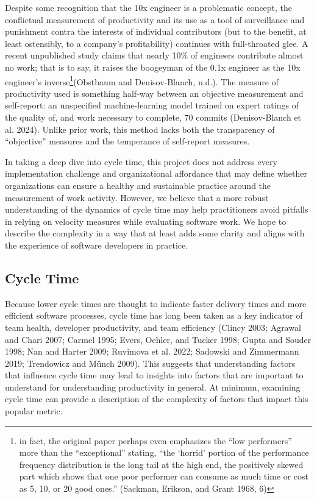 \documentclass[
]{article}
\begin{document}
Despite some recognition that the 10x engineer is a problematic concept,
the conflictual measurement of productivity and its use as a tool of
surveillance and punishment contra the interests of individual
contributors (but to the benefit, at least ostensibly, to a company's
profitability) continues with full-throated glee. A recent unpublished
study claims that nearly 10\% of engineers contribute almost no work;
that is to say, it raises the boogeyman of the 0.1x engineer as the 10x
engineer's inverse\footnote{in fact, the original paper perhaps even
  emphasizes the ``low performers'' more than the ``exceptional''
  stating, ``the `horrid' portion of the performance frequency
  distribution is the long tail at the high end, the positively skewed
  part which shows that one poor performer can consume as much time or
  cost as 5, 10, or 20 good ones.'' (Sackman, Erikson, and Grant 1968,
  6)}(Obstbaum and Denisov-Blanch, n.d.). The measure of productivity
used is something half-way between an objective measurement and
self-report: an unspecified machine-learning model trained on expert
ratings of the quality of, and work necessary to complete, 70 commits
(Denisov-Blanch et al. 2024). Unlike prior work, this method lacks both
the transparency of ``objective'' measures and the temperance of
self-report measures.

In taking a deep dive into cycle time, this project does not address
every implementation challenge and organizational affordance that may
define whether organizations can ensure a healthy and sustainable
practice around the measurement of work activity. However, we believe
that a more robust understanding of the dynamics of cycle time may help
practitioners avoid pitfalls in relying on velocity measures while
evaluating software work. We hope to describe the complexity in a way
that at least adds some clarity and aligns with the experience of
software developers in practice.

\subsection{Cycle Time}\label{cycle-time}

Because lower cycle times are thought to indicate faster delivery times
and more efficient software processes, cycle time has long been taken as
a key indicator of team health, developer productivity, and team
efficiency (Clincy 2003; Agrawal and Chari 2007; Carmel 1995; Evers,
Oehler, and Tucker 1998; Gupta and Souder 1998; Nan and Harter 2009;
Ruvimova et al. 2022; Sadowski and Zimmermann 2019; Trendowicz and Münch
2009). This suggests that understanding factors that influence cycle
time may lead to insights into factors that are important to understand
for understanding productivity in general. At minimum, examining cycle
time can provide a description of the complexity of factors that impact
this popular metric.
\end{document}
